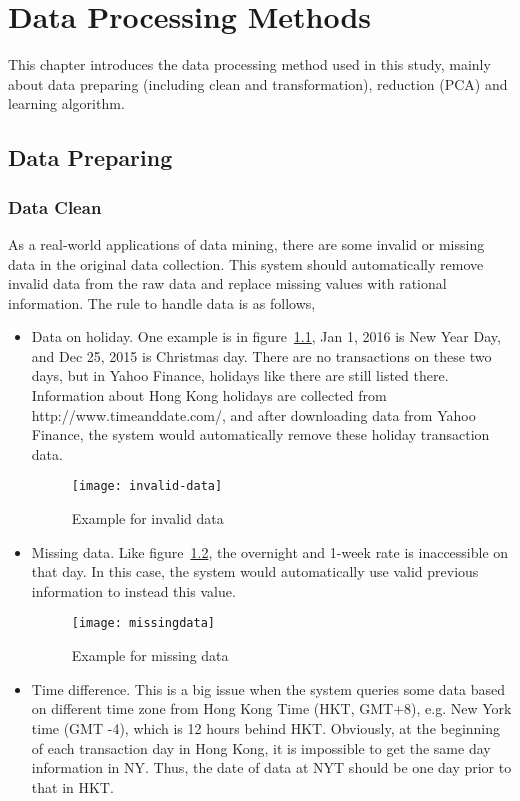 \chapter{Data Processing Methods}
\label{ch:mining}

This chapter introduces the data processing method used in this study, mainly about data preparing (including clean and transformation), reduction (PCA) and learning algorithm.

\section{Data Preparing}

\subsection{Data Clean}
As a real-world applications of data mining, there are some invalid or missing data in the original data collection. This system should automatically remove invalid data from the raw data and replace missing values with rational information. The rule to handle data is as follows,

\begin{itemize}
	\item Data on holiday. One example is in figure~\ref{fg:invalid_data}, Jan 1, 2016 is New Year Day, and Dec 25, 2015 is Christmas day. There are no transactions on these two days, but in Yahoo Finance, holidays like there are still listed there. Information about Hong Kong holidays are collected from http://www.timeanddate.com/, and after downloading data from Yahoo Finance, the system would automatically remove these holiday transaction data.
	\begin{figure}[h]
		\centering
		\texttt{[image: invalid-data]}
		\caption{Example for invalid data}
		\label{fg:invalid_data}
	\end{figure}
	\item Missing data. Like figure~\ref{fg:missing_data}, the overnight and 1-week rate is inaccessible on that day. In this case, the system would automatically use valid previous information to instead this value.
	\begin{figure}[h]
		\centering
		\texttt{[image: missingdata]}
		\caption{Example for missing data}
		\label{fg:missing_data}
	\end{figure}
	\item Time difference. This is a big issue when the system queries some data based on different time zone from Hong Kong Time (HKT, GMT+8), e.g. New York time (GMT -4), which is 12 hours behind HKT. Obviously, at the beginning of each transaction day in Hong Kong, it is impossible to get the same day information in NY. Thus, the date of data at NYT should be one day prior to that in HKT.
\end{itemize}


